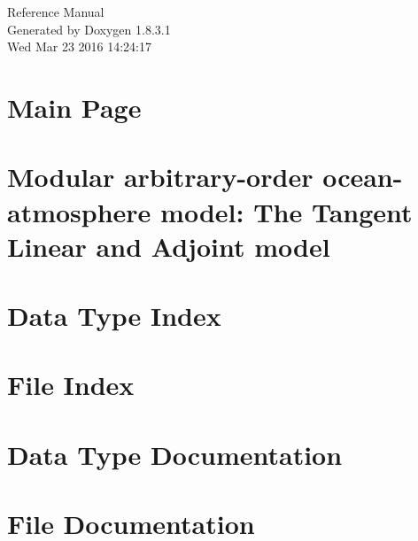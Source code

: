 \documentclass{book}
\begin{document}
\hypersetup{pageanchor=false,citecolor=blue}
\begin{titlepage}
\vspace*{7cm}
\begin{center}
{\Large Reference Manual}\\
\vspace*{1cm}
{\large Generated by Doxygen 1.8.3.1}\\
\vspace*{0.5cm}
{\small Wed Mar 23 2016 14:24:17}\\
\end{center}
\end{titlepage}
\clearemptydoublepage
{}
\tableofcontents
\clearemptydoublepage
{}
\hypersetup{pageanchor=true,citecolor=blue}
\chapter{Main Page}
\label{index}\hypertarget{index}{}
\chapter{Modular arbitrary-\/order ocean-\/atmosphere model\-: The Tangent Linear and Adjoint model}
\label{md_tl_ad_doc}
\hypertarget{md_tl_ad_doc}{}

\chapter{Data Type Index}

\chapter{File Index}

\chapter{Data Type Documentation}
















\chapter{File Documentation}

















\printindex
\end{document}

